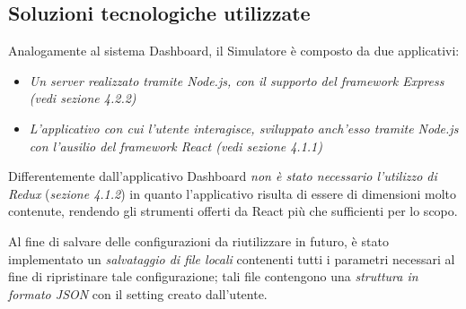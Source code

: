 \subsection{Soluzioni tecnologiche utilizzate}
Analogamente al sistema Dashboard, il Simulatore è composto da due applicativi:
\begin{itemize}
  \item \emph{Un server realizzato tramite Node.js, con il supporto del framework Express (vedi sezione 4.2.2)}
  \item \emph{L'applicativo con cui l'utente interagisce, sviluppato anch'esso tramite Node.js con l'ausilio del framework React (vedi sezione 4.1.1)}
\end{itemize}
Differentemente dall'applicativo Dashboard \emph{non è stato necessario l'utilizzo di Redux} (\emph{sezione 4.1.2}) in quanto l'applicativo risulta di essere di dimensioni molto contenute, rendendo gli strumenti offerti da React più che sufficienti per lo scopo.\newline

\noindent Al fine di salvare delle configurazioni da riutilizzare in futuro, è stato implementato un \emph{salvataggio di file locali} contenenti tutti i parametri necessari al fine di ripristinare tale configurazione; tali file contengono una \emph{struttura in formato JSON} con il setting creato dall'utente. 